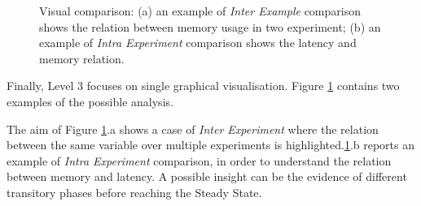 \begin{figure}[tbh]
  \centering
\caption[\textsc{Analyser} Investigation Stack - Level 3 - Visual Comparison Examples]{Visual comparison: (a) an example of \textit{Inter Example} comparison shows the relation between memory usage in two experiment; (b) an example of \textit{Intra Experiment} comparison shows the latency and memory relation.}
  \label{fig:visual-comp}
\end{figure}

\noindent Finally, Level 3 focuses on single graphical visualisation. Figure \ref{fig:visual-comp} contains two examples of the possible analysis. 

The aim of Figure \ref{fig:visual-comp}.a shows a case of \textit{Inter Experiment} where the relation between the same variable over multiple experiments is highlighted.\ref{fig:visual-comp}.b reports an example of \textit{Intra Experiment} comparison, in order to understand the relation between memory and latency. A possible insight can be the evidence of different transitory phases before reaching the Steady State.
